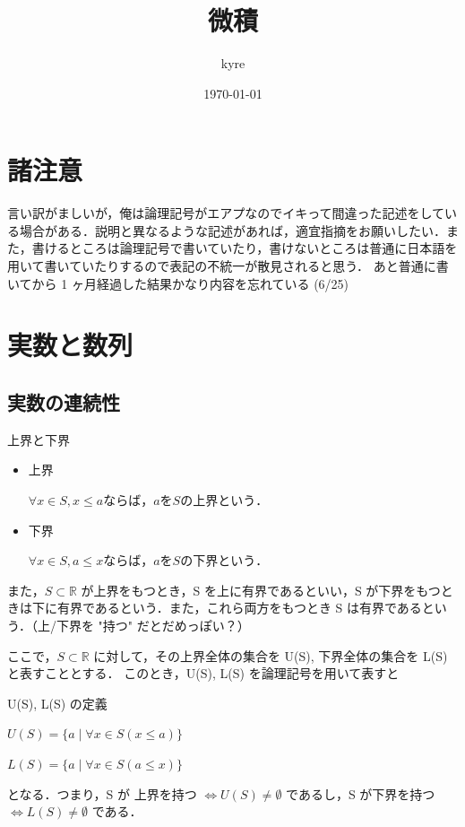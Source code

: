 \documentclass[a4paper, platex,dvipdfmx]{jlreq}			%
\title{微積}
\author{kyre}
\date{\today}
\begin{document}
\section*{諸注意}
言い訳がましいが，俺は論理記号がエアプなのでイキって間違った記述をしている場合がある．説明と異なるような記述があれば，適宜指摘をお願いしたい．また，書けるところは論理記号で書いていたり，書けないところは普通に日本語を用いて書いていたりするので表記の不統一が散見されると思う．
あと普通に書いてから 1 ヶ月経過した結果かなり内容を忘れている (6/25)

\section{実数と数列}

\subsection{実数の連続性}

\begin{mytcb}{上界と下界}{}
\begin{itemize}
\item 上界 

\begin{math}
\forall x \in S, x \leq a ならば， a を S の上界という．
\end{math}

\item 下界 

\begin{math}
\forall x \in S, a \leq x ならば，a を S の下界という．
\end{math}
\end{itemize}
\end{mytcb}

また，$S \subset \mathbb{R}$ が上界をもつとき，S を上に有界であるといい，S が下界をもつときは下に有界であるという．また，これら両方をもつとき S は有界であるという．（上/下界を "持つ" だとだめっぽい？）

ここで，$S \subset \mathbb{R}$ に対して，その上界全体の集合を U(S), 下界全体の集合を L(S) と表すこととする．
このとき，U(S), L(S) を論理記号を用いて表すと
\begin{mytcb}{U(S), L(S) の定義}{}
\centerline
{$
U(S) = \{a \mid \forall x \in S (x \leq a)\}
$}
\centerline
{$
L(S) = \{a \mid \forall x \in S (a \leq x)\}
$}
\end{mytcb}
となる．つまり，S が 上界を持つ $\Leftrightarrow U(S) \neq \emptyset$  であるし，S が下界を持つ $\Leftrightarrow L(S) \neq \emptyset$ である．
\end{document}
